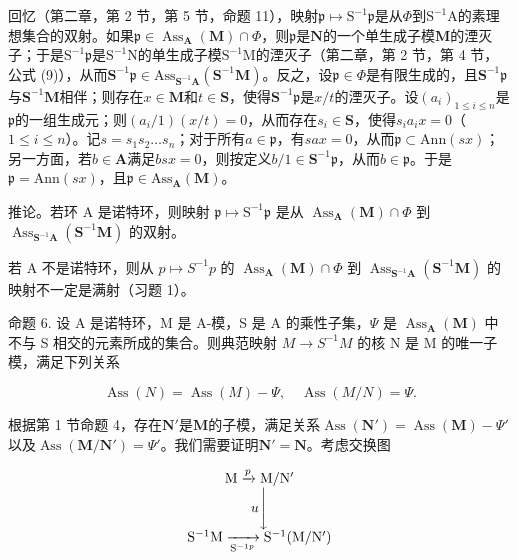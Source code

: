 回忆（第二章，第 2 节，第 5 节，命题 11），映射\(\mathfrak{p} \mapsto \mathrm{S}^{-1}\mathfrak{p}\)是从\(\Phi\)到\(\mathrm{S}^{-1}\mathrm{A}\)的素理想集合的双射。如果\(\mathfrak{p} \in \operatorname{Ass}_{\mathbf{A}}(\mathbf{M}) \cap \Phi\)，则\(\mathfrak{p}\)是\(\mathbf{N}\)的一个单生成子模\(\mathbf{M}\)的湮灭子；于是\(\mathrm{S}^{-1}\mathfrak{p}\)是\(\mathrm{S}^{-1}\mathrm{N}\)的单生成子模\(\mathrm{S}^{-1}\mathrm{M}\)的湮灭子（第二章，第 2 节，第 4 节，公式 (9)），从而\(\mathbf{S}^{-1}\mathfrak{p}\in\mathrm{Ass}_{\mathbf{S}^{-1}\mathbf{A}}(\mathbf{S}^{-1}\mathbf{M})\)。反之，设\(\mathfrak{p}\in\Phi\)是有限生成的，且\(\mathbf{S}^{-1}\mathfrak{p}\)与\(\mathbf{S}^{-1}\mathbf{M}\)相伴；则存在\(x\in\mathbf{M}\)和\(t\in\mathbf{S}\)，使得\(\mathbf{S}^{-1}\mathfrak{p}\)是\(x/t\)的湮灭子。设\((a_{i})_{1\leqslant i\leqslant n}\)是\(\mathfrak{p}\)的一组生成元；则\((a_{i}/1)(x/t)=0\)，从而存在\(s_{i}\in\mathbf{S}\)，使得\(s_{i}a_{i}x=0\)（\(1\leqslant i\leqslant n\)）。记\(s=s_{1}s_{2}\ldots s_{n}\)；对于所有\(a\in\mathfrak{p}\)，有\(sax=0\)，从而\(\mathfrak{p}\subset\mathrm{Ann}(sx)\)；另一方面，若\(b\in\mathbf{A}\)满足\(bsx=0\)，则按定义\(b/1\in\mathbf{S}^{-1}\mathfrak{p}\)，从而\(b\in\mathfrak{p}\)。于是\(\mathfrak{p}=\mathrm{Ann}(sx)\)，且\(\mathfrak{p}\in\mathrm{Ass}_{\mathbf{A}}(\mathbf{M})\)。

推论。若环 A 是诺特环，则映射 \(\mathfrak{p} \mapsto \mathrm{S}^{-1}\mathfrak{p}\) 是从 \(\operatorname{Ass}_{\mathbf{A}}(\mathbf{M}) \cap \Phi\) 到 \(\operatorname{Ass}_{\mathbf{S}^{-1}\mathbf{A}}(\mathbf{S}^{-1}\mathbf{M})\) 的双射。

若 A 不是诺特环，则从 \(p \mapsto S^{-1}p\) 的 \(\operatorname{Ass}_{\mathbf{A}}(\mathbf{M}) \cap \Phi\) 到 \(\operatorname{Ass}_{\mathbf{S}^{-1}\mathbf{A}}(\mathbf{S}^{-1}\mathbf{M})\) 的映射不一定是满射（习题 1）。

命题 6. 设 A 是诺特环，M 是 A-模，S 是 A 的乘性子集，\(\Psi\) 是 \(\operatorname{Ass}_{\mathbf{A}}(\mathbf{M})\) 中不与 S 相交的元素所成的集合。则典范映射 \(M \to S^{-1}M\) 的核 N 是 M 的唯一子模，满足下列关系

\[
\operatorname{Ass} (N) = \operatorname{Ass} (M) - \Psi , \quad \operatorname{Ass} (M / N) = \Psi .\tag{3}
\]

根据第 1 节命题 4，存在\(\mathbf{N}'\)是\(\mathbf{M}\)的子模，满足关系\(\operatorname{Ass}(\mathbf{N}') = \operatorname{Ass}(\mathbf{M}) - \Psi'\)以及\(\operatorname{Ass}(\mathbf{M}/\mathbf{N}') = \Psi'\)。我们需要证明\(\mathbf{N}' = \mathbf{N}\)。考虑交换图

\[
\begin{array}{c} \mathrm{M} \xrightarrow {p} \mathrm{M} / \mathrm{N} ^ {\prime} \\ u \Biggl \downarrow \\ \mathrm{S} ^ {- 1} \mathrm{M} \xrightarrow [ \mathrm{S} ^ {- 1 p} ]{} \mathrm{S} ^ {- 1} (\mathrm{M} / \mathrm{N} ^ {\prime}) \end{array}
\]

